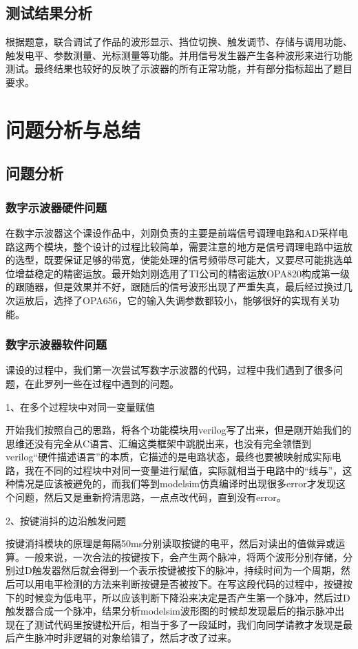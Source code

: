 \documentclass[supercite]{HustGraduPaper}
\begin{document}
	\subsection{测试结果分析}
	
	根据题意，联合调试了作品的波形显示、挡位切换、触发调节、存储与调用功能、触发电平、参数测量、光标测量等功能。并用信号发生器产生各种波形来进行功能测试。最终结果也较好的反映了示波器的所有正常功能，并有部分指标超出了题目要求。
	
	
	\section{问题分析与总结}
	\subsection{问题分析}
	\subsubsection{数字示波器硬件问题}
	在数字示波器这个课设作品中，刘刚负责的主要是前端信号调理电路和AD采样电路这两个模块，整个设计的过程比较简单，需要注意的地方是信号调理电路中运放的选型，既要保证足够的带宽，使能处理的信号频带尽可能大，又要尽可能挑选单位增益稳定的精密运放。最开始刘刚选用了TI公司的精密运放OPA820构成第一级的跟随器，但是效果并不好，跟随后的信号波形出现了严重失真，最后经过换过几次运放后，选择了OPA656，它的输入失调参数都较小，能够很好的实现有关功能。
	
	
	\subsubsection{数字示波器软件问题}
	课设的过程中，我们第一次尝试写数字示波器的代码，过程中我们遇到了很多问题，在此罗列一些在过程中遇到的问题。
	
	1、在多个过程块中对同一变量赋值
	
	开始我们按照自己的思路，将各个功能模块用verilog写了出来，但是刚开始我们的思维还没有完全从C语言、汇编这类框架中跳脱出来，也没有完全领悟到verilog“硬件描述语言”的本质，它描述的是电路状态，最终也要被映射成实际电路，我在不同的过程块中对同一变量进行赋值，实际就相当于电路中的“线与”，这种情况是应该被避免的，而我们等到modelsim仿真编译时出现很多error才发现这个问题，然后又是重新捋清思路，一点点改代码，直到没有error。
	
	2、按键消抖的边沿触发问题
	
	按键消抖模块的原理是每隔50ms分别读取按键的电平，然后对读出的值做异或运算。一般来说，一次合法的按键按下，会产生两个脉冲，将两个波形分别存储，分别过D触发器然后就会得到一个表示按键被按下的脉冲，持续时间为一个周期，然后可以用电平检测的方法来判断按键是否被按下。在写这段代码的过程中，按键按下的时候变为低电平，所以应该判断下降沿来决定是否产生第一个脉冲，然后过D触发器合成一个脉冲，结果分析modelsim波形图的时候却发现最后的指示脉冲出现在了测试代码里按键松开后，相当于多了一段延时，我们向同学请教才发现是最后产生脉冲时非逻辑的对象给错了，然后才改了过来。
	
\end{document}
